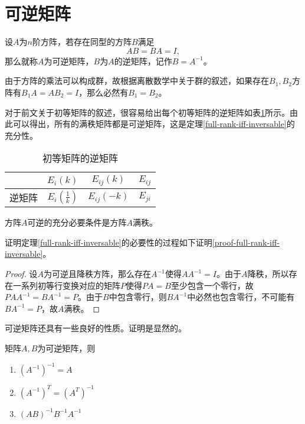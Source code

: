\section{可逆矩阵} %

\begin{definition}
    \label{inversable-matrix}
    设$A$为$n$阶方阵，若存在同型的方阵$B$满足
    \[ AB=BA=I, \]
    那么就称$A$为可逆矩阵，$B$为$A$的逆矩阵，记作$B=A^{-1}$。
\end{definition}

由于方阵的乘法可以构成群，故根据离散数学中关于群的叙述，如果存在$B_1,B_2$方阵有$B_1A=AB_2=I$，那么必然有$B_1=B_2$。

对于前文关于初等矩阵的叙述，很容易给出每个初等矩阵的逆矩阵如表\ref{inverse-elementory}所示。由此可以得出，所有的满秩矩阵都是可逆矩阵，这是定理\ref{full-rank-iff-inversable}的充分性。

\begin{table}[!hbt]
    \centering
    \begin{tabular}{cccc}
        \toprule
        & $E_i(k)$ & $E_{ij}(k)$ & $E_{ij}$ \\
        \midrule
        逆矩阵 & $E_i\left(\frac1k\right)$ & $E_{ij}(-k)$ & $E_{ji}$ \\
        \bottomrule
    \end{tabular}
    \caption{初等矩阵的逆矩阵}
    \label{inverse-elementory}
\end{table}

\begin{thm}
    \label{full-rank-iff-inversable}
    方阵$A$可逆的充分必要条件是方阵$A$满秩。
\end{thm}

证明定理\ref{full-rank-iff-inversable}的必要性的过程如下证明\ref{proof-full-rank-iff-inversable}。

\begin{proof}
    \label{proof-full-rank-iff-inversable}
    设$A$为可逆且降秩方阵，那么存在$A^{-1}$使得$AA^{-1}=I$。由于$A$降秩，所以存在一系列初等行变换对应的矩阵$P$使得$PA=B$至少包含一个零行，故$PAA^{-1}=BA^{-1}=P$。由于$B$中包含零行，则$BA^{-1}$中必然也包含零行，不可能有$BA^{-1}=P$，故$A$满秩。
\end{proof}

可逆矩阵还具有一些良好的性质。证明是显然的。

\begin{property}
    \label{property-of-inversable-matrix}
    矩阵$A,B$为可逆矩阵，则
    \begin{enumerate}
        \item $(A^{-1})^{-1}=A$
        \item $(A^{-1})^T=(A^T)^{-1}$
        \item $(AB)^{-1}B^{-1}A^{-1}$
    \end{enumerate}
\end{property}

